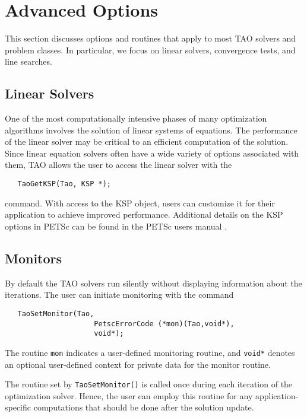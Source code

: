 
\chapter{Advanced Options}

This section discusses options and routines that apply to most TAO
solvers and problem classes.  In particular, we focus on
linear solvers, convergence tests, and line searches.

\section{Linear Solvers}\label{sec_TaoLinearSolvers}
One of the most computationally intensive phases of many optimization
algorithms involves the solution of linear systems of equations.  
The performance of the linear solver may be critical to an efficient 
computation of the solution.  Since linear equation solvers often have 
a wide variety of options associated with them, TAO allows the user to 
access the linear solver with the
\begin{verbatim}
   TaoGetKSP(Tao, KSP *);
\end{verbatim}
command. 
With access to the KSP object, users can customize it for their application
to achieve improved performance. Additional details on the KSP options in
PETSc can be found in the PETSc users manual \cite{petsc-user-ref}.



\section{Monitors}
By default the TAO solvers run silently without displaying information
about the iterations. The user can initiate monitoring with the
command  
\begin{verbatim}
   TaoSetMonitor(Tao,
                     PetscErrorCode (*mon)(Tao,void*),
                     void*);
\end{verbatim}
\noindent
The routine {\tt mon} indicates a user-defined monitoring routine,
and {\tt void*} denotes an optional user-defined context for private 
data for the monitor routine.

The routine set by {\tt TaoSetMonitor()} is called once during each
iteration of the optimization solver.  Hence, the user can employ this 
routine for any application-specific computations that should be done 
after the solution update. 





